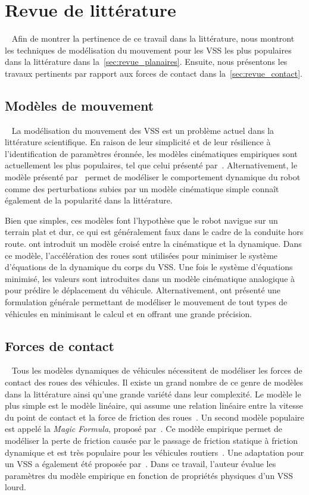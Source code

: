 \section{Revue de littérature}~\label{sec:revue}
Afin de montrer la pertinence de ce travail dans la littérature, nous montront les techniques de modélisation du mouvement pour les \ac{VSS} les plus populaires dans la littérature dans la~\autoref{sec:revue_planaires}. 
Ensuite, nous présentons les travaux pertinents par rapport aux forces de contact dans la~\autoref{sec:revue_contact}.

\subsection{Modèles de mouvement}~\label{sec:revue_planaires}
La modélisation du mouvement des \ac{VSS} est un problème actuel dans la littérature scientifique.
En raison de leur simplicité et de leur résilience à l'identification de paramètres éronnée, les modèles cinématiques empiriques sont actuellement les plus populaires, tel que celui présenté par~\citet{Mandow2007}.
Alternativement, le modèle présenté par~\citet{Seegmiller2014} permet de modéliser le comportement dynamique du robot comme des perturbations subies par un modèle cinématique simple connaît également de la popularité dans la littérature.

Bien que simples, ces modèles font l'hypothèse que le robot navigue sur un terrain plat et dur, ce qui est généralement faux dans le cadre de la conduite hors route.
\citet{Rabiee2019} ont introduit un modèle croisé entre la cinématique et la dynamique.
Dans ce modèle, l'accélération des roues sont utilisées pour minimiser le système d'équations de la dynamique du corps du \ac{VSS}.
Une fois le système d'équations minimisé, les valeurs sont introduites dans un modèle cinématique analogique à~\citep{Mandow2007} pour prédire le déplacement du véhicule.
Alternativement, \citet{Seegmiller2016} ont présenté une formulation générale permettant de modéliser le mouvement de tout types de véhicules en minimisant le calcul et en offrant une grande précision.

\subsection{Forces de contact}~\label{sec:revue_contact}
Tous les modèles dynamiques de véhicules nécessitent de modéliser les forces de contact des roues des véhicules.
Il existe un grand nombre de ce genre de modèles dans la littérature ainsi qu'une grande variété dans leur complexité.
Le modèle le plus simple est le modèle linéaire, qui assume une relation linéaire entre la vitesse du point de contact et la force de friction des roues~\citep{Pacejka2012}. 
Un second modèle populaire est appelé la \textit{Magic Formula}, proposé par~\citet{Pacejka2012}.
Ce modèle empirique permet de modéliser la perte de friction causée par le passage de friction statique à friction dynamique et est très populaire pour les véhicules routiers~\citep{Brach2011}.
Une adaptation pour un \ac{VSS} a également été proposée par~\citet{Maclaurin2011}.
Dans ce travail, l'auteur évalue les paramètres du modèle empirique en fonction de propriétés physiques d'un \ac{VSS} lourd.

